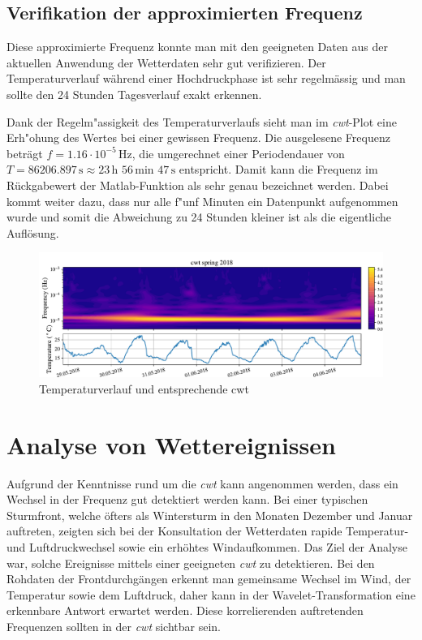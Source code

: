 \begin{refsection}
\subsection{Verifikation der approximierten Frequenz}
\label{Freq}
Diese approximierte Frequenz konnte man mit den geeigneten Daten aus der aktuellen Anwendung der Wetterdaten sehr gut verifizieren.
Der Temperaturverlauf während einer Hochdruckphase ist sehr regelmässig und man sollte den 24 Stunden Tagesverlauf exakt erkennen.

Dank der Regelm"assigkeit des Temperaturverlaufs sieht man im \textit{cwt}-Plot eine Erh"ohung des Wertes bei einer gewissen Frequenz.
Die ausgelesene Frequenz beträgt $f = 1.16\cdot10^{-5} \,\text{Hz}$, die umgerechnet einer Periodendauer von $T = 86206.897\,\text{s}\approx 23\,\text{h }56\,\text{min } 47\,\text{s}$ entspricht.
Damit kann die Frequenz im Rückgabewert der Matlab-Funktion als sehr genau bezeichnet werden.
Dabei kommt weiter dazu, dass nur alle f"unf Minuten ein Datenpunkt aufgenommen wurde und somit die Abweichung zu 24 Stunden kleiner ist als die eigentliche Auflösung.

\begin{figure}[h]
	\centering
	\includegraphics[width=1\textwidth]{papers/wwt/images/data_spring.pdf}
	\caption{Temperaturverlauf und entsprechende cwt}
	\label{fig:cwt_zoom}
\end{figure}



\section{Analyse von Wettereignissen}
Aufgrund der Kenntnisse rund um die \textit{cwt} kann angenommen werden, dass ein Wechsel in der Frequenz gut detektiert werden kann.
Bei einer typischen Sturmfront, welche öfters als Wintersturm in den Monaten Dezember und Januar auftreten, zeigten sich bei der Konsultation der Wetterdaten rapide Temperatur- und Luftdruckwechsel sowie ein erhöhtes Windaufkommen.
Das Ziel der Analyse war, solche Ereignisse mittels einer geeigneten \textit{cwt} zu detektieren.
Bei den Rohdaten der Frontdurchgängen erkennt man gemeinsame Wechsel im Wind, der Temperatur sowie dem Luftdruck, daher kann in der Wavelet-Transformation eine erkennbare Antwort erwartet werden. 
Diese korrelierenden auftretenden Frequenzen sollten in der \textit{cwt} sichtbar sein.


\end{refsection}
